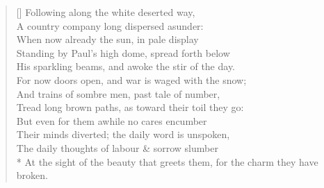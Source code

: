 \documentclass[MAIN]{subfiles}
\begin{document}
\begin{verse}[\versewidth]
\vin Following along the white deserted way,\\
A country company long dispersed asunder:\\
\vin When now already the sun, in pale display\\
Standing by {\sc Paul's} high dome, spread forth below\\
\vin His sparkling beams, and awoke the stir of the day.\\
For now doors open, and war is waged with the snow;\\
\vin And trains of sombre men, past tale of number,\\
Tread long brown paths, as toward their toil they go:\\
\vin But even for them awhile no cares encumber\\
Their minds diverted; the daily word is unspoken,\\
\vin The daily thoughts of labour \& sorrow slumber\\*
At the sight of the beauty that greets them, for the charm they have broken.
\end{verse}
\end{document}
